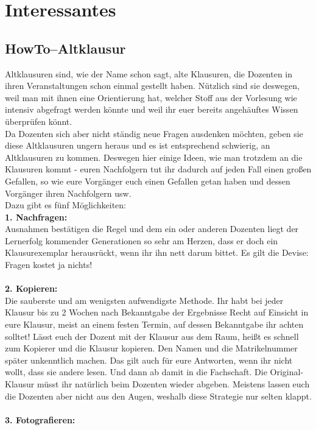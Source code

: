 \chapter{Interessantes}

\section{HowTo--Altklausur}
Altklausuren sind, wie der Name schon sagt, alte Klausuren, die Dozenten in ihren Veranstaltungen schon einmal gestellt haben. Nützlich sind sie deswegen, weil man mit ihnen eine Orientierung hat, welcher Stoff aus der Vorlesung wie intensiv abgefragt werden könnte und weil ihr euer bereits angehäuftes Wissen überprüfen könnt.\\
Da Dozenten sich aber nicht ständig neue Fragen ausdenken möchten, geben sie diese Altklausuren ungern heraus und es ist entsprechend schwierig, an Altklausuren zu kommen. Deswegen hier einige Ideen, wie man trotzdem an die Klausuren kommt - euren Nachfolgern tut ihr dadurch auf jeden Fall einen großen Gefallen, so wie eure Vorgänger euch einen Gefallen getan haben und dessen Vorgänger ihren Nachfolgern usw.\\
Dazu gibt es fünf Möglichkeiten:\\
\textbf{1. Nachfragen:}\\
Ausnahmen bestätigen die Regel und dem ein oder anderen Dozenten liegt der Lernerfolg kommender Generationen so sehr am Herzen, dass er doch ein Klausurexemplar herausrückt, wenn ihr ihn nett darum bittet. Es gilt die Devise: Fragen kostet ja nichts!\\
\\
\textbf{2. Kopieren:}\\
Die sauberste und am wenigsten aufwendigste Methode. Ihr habt bei jeder Klausur bis zu 2 Wochen nach Bekanntgabe der Ergebnisse Recht auf Einsicht in eure Klausur, meist an einem festen Termin, auf dessen Bekanntgabe ihr achten solltet! Lässt euch der Dozent mit der Klausur aus dem Raum, heißt es schnell zum Kopierer und die Klausur kopieren. Den Namen und die Matrikelnummer später unkenntlich machen. Das gilt auch für eure Antworten, wenn ihr nicht wollt, dass sie andere lesen. Und dann ab damit in die Fachschaft. Die Original-Klausur müsst ihr natürlich beim Dozenten wieder abgeben. Meistens lassen euch die Dozenten aber nicht aus den Augen, weshalb diese Strategie nur selten klappt.\\
\\
\textbf{3. Fotografieren:}\\
